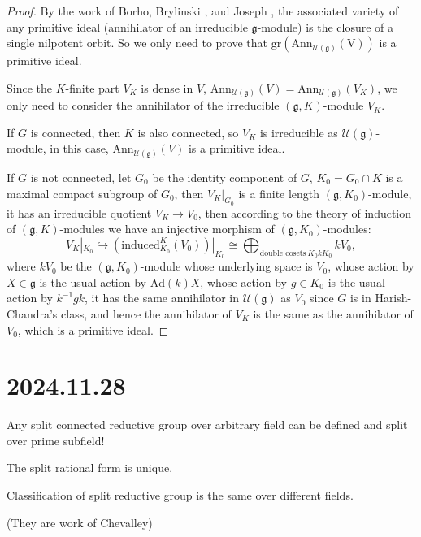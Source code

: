 \documentclass[12pt]{amsart}
\numberwithin{equation}{section}
\newcommand{\CU}{{\mathcal {U}}}
\newcommand{\Ann}{{\mathrm{Ann}}}
\newcommand{\fg}{\mathfrak{g}}
\newcommand{\Ad}{{\mathrm{Ad}}}
\begin{document}
\begin{proof}
  By the work of Borho, Brylinski \cite{BB}, and Joseph \cite{Jos}, the associated variety of any primitive ideal (annihilator of an irreducible $\fg$-module) is the closure of a single nilpotent orbit. So we only need to prove that $\mathrm{gr}(\mathrm{Ann_{\CU(\fg)}(V)})$ is a primitive ideal.

  Since the $K$-finite part $V_K$ is dense in $V$, $\Ann_{\CU(\fg)}(V) = \Ann_{\CU(\fg)}(V_K)$, we only need to consider the annihilator of the irreducible $(\fg,K)$-module $V_K$.

  If $G$ is connected, then $K$ is also connected, so $V_K$ is irreducible as $\CU(\fg)$-module, in this case, $\Ann_{\CU(\fg)}(V)$ is a primitive ideal.

  If $G$ is not connected, let $G_0$ be the identity component of $G$, $K_0 = G_0 \cap K$ is a maximal compact subgroup of $G_0$, then $V_K|_{G_0}$ is a finite length $(\fg,K_0)$-module, it has an irreducible quotient $V_K \to V_0$, then according to the theory of induction of $(\fg,K)$-modules \cite[Chapter 2]{KV} we have an injective morphism of $(\fg,K_0)$-modules:
  \begin{equation}
     V_K|_{K_0} \hookrightarrow  (\mathrm{induced}_{K_0}^{K}(V_0))|_{K_0} \cong \bigoplus_{\textrm{double cosets} \ K_0 k K_0} kV_0,
  \end{equation}
  where $kV_0$ be the $(\fg,K_0)$-module whose underlying space is $V_0$, whose action by $X \in \fg$ is the usual action by $\Ad(k)X$, whose action by $g \in K_0$ is the usual action by $k^{-1}gk$, it has the same annihilator in $\CU(\fg)$ as $V_0$ since $G$ is in Harish-Chandra's class, and hence the annihilator of $V_K$ is the same as the annihilator of $V_0$, which is a primitive ideal.

\end{proof}

\newpage

\section{2024.11.28}
Any split connected reductive group over arbitrary field can be defined and split over prime subfield!

The split rational form is unique.

Classification of split reductive group is the same over different fields.

(They are work of Chevalley)
\end{document}
